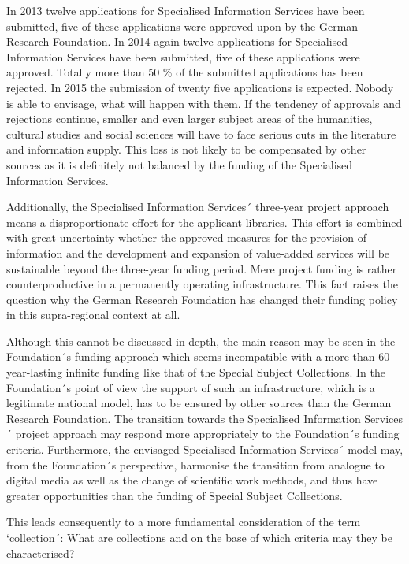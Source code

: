 \documentclass[a4paper,
fontsize=11pt,
oneside,
numbers=noperiodatend,
parskip=half-,
bibliography=totoc,
final
]{scrartcl}
\begin{document}
In 2013 twelve applications for Specialised Information Services have
been submitted, five of these applications were approved upon by the
German Research Foundation. In 2014 again twelve applications for
Specialised Information Services have been submitted, five of these
applications were approved. Totally more than 50 \% of the submitted
applications has been rejected. In 2015 the submission of twenty five
applications is expected. Nobody is able to envisage, what will happen
with them. If the tendency of approvals and rejections continue, smaller
and even larger subject areas of the humanities, cultural studies and
social sciences will have to face serious cuts in the literature and
information supply. This loss is not likely to be compensated by other
sources as it is definitely not balanced by the funding of the
Specialised Information Services.

Additionally, the Specialised Information Services´ three-year project
approach means a disproportionate effort for the applicant libraries.
This effort is combined with great uncertainty whether the approved
measures for the provision of information and the development and
expansion of value-added services will be sustainable beyond the
three-year funding period. Mere project funding is rather
counterproductive in a permanently operating infrastructure. This fact
raises the question why the German Research Foundation has changed their
funding policy in this supra-regional context at all.

Although this cannot be discussed in depth, the main reason may be seen
in the Foundation´s funding approach which seems incompatible with a
more than 60-year-lasting infinite funding like that of the Special
Subject Collections. In the Foundation´s point of view the support of
such an infrastructure, which is a legitimate national model, has to be
ensured by other sources than the German Research Foundation. The
transition towards the Specialised Information Services´ project
approach may respond more appropriately to the Foundation´s funding
criteria. Furthermore, the envisaged Specialised Information Services´
model may, from the Foundation´s perspective, harmonise the transition
from analogue to digital media as well as the change of scientific work
methods, and thus have greater opportunities than the funding of Special
Subject Collections.

This leads consequently to a more fundamental consideration of the term
`collection´: What are collections and on the base of which criteria may
they be characterised?
\end{document}
